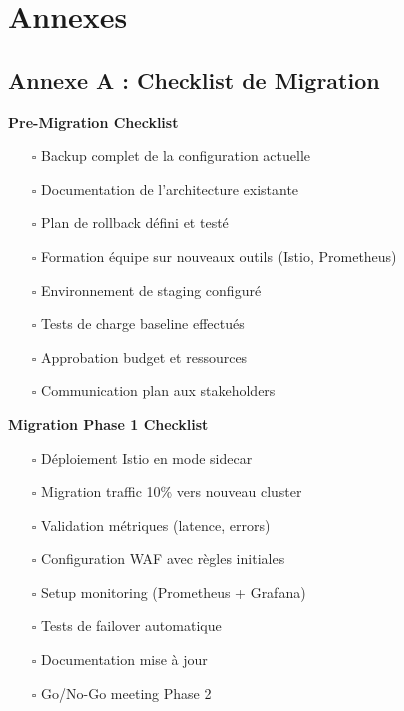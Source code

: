 \documentclass[12pt,a4paper]{article}
\begin{document}
\newpage
\section{Annexes}

\subsection{Annexe A : Checklist de Migration}

\begin{tcolorbox}[colback=gray!5,colframe=gray!50!black]
\textbf{Pre-Migration Checklist}

\begin{itemize}[leftmargin=1cm]
    \item[$\square$] Backup complet de la configuration actuelle
    \item[$\square$] Documentation de l'architecture existante
    \item[$\square$] Plan de rollback défini et testé
    \item[$\square$] Formation équipe sur nouveaux outils (Istio, Prometheus)
    \item[$\square$] Environnement de staging configuré
    \item[$\square$] Tests de charge baseline effectués
    \item[$\square$] Approbation budget et ressources
    \item[$\square$] Communication plan aux stakeholders
\end{itemize}

\textbf{Migration Phase 1 Checklist}

\begin{itemize}[leftmargin=1cm]
    \item[$\square$] Déploiement Istio en mode sidecar
    \item[$\square$] Migration traffic 10\% vers nouveau cluster
    \item[$\square$] Validation métriques (latence, errors)
    \item[$\square$] Configuration WAF avec règles initiales
    \item[$\square$] Setup monitoring (Prometheus + Grafana)
    \item[$\square$] Tests de failover automatique
    \item[$\square$] Documentation mise à jour
    \item[$\square$] Go/No-Go meeting Phase 2
\end{itemize}
\end{tcolorbox}
\end{document}
